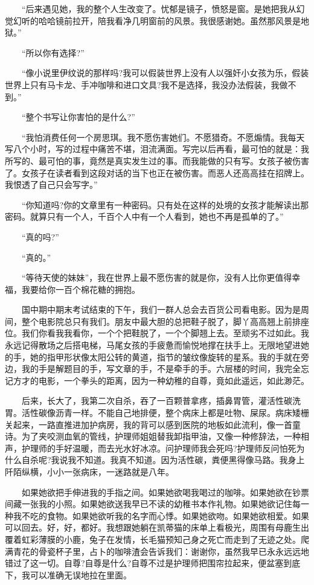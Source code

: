 \documentclass[12pt,UTF8]{ctexbook}
\begin{document}
　　\enquote{后来遇见她，我的整个人生改变了。忧郁是镜子，愤怒是窗。是她把我从幻觉幻听的哈哈镜前拉开，陪我看净几明窗前的风景。我很感谢她。虽然那风景是地狱。}

　　\enquote{所以你有选择?}

　　\enquote{像小说里伊纹说的那样吗?我可以假装世界上没有人以强奸小女孩为乐，假装世界上只有马卡龙、手冲咖啡和进口文具?我不是选择，我没办法假装，我做不到。}

　　\enquote{整个书写让你害怕的是什么?}

　　\enquote{我怕消费任何一个房思琪。我不愿伤害她们。不愿猎奇。不愿煽情。我每天写八个小时，写的过程中痛苦不堪，泪流满面。写完以后再看，最可怕的就是：我所写的、最可怕的事，竟然是真实发生过的事。而我能做的只有写。女孩子被伤害了。女孩子在读者看到这段对话的当下也正在被伤害。而恶人还高高挂在招牌上。我恨透了自己只会写字。}

　　\enquote{你知道吗?你的文章里有一种密码。只有处在这样的处境的女孩才能解读出那密码。就算只有一个人，千百个人中有一个人看到，她也不再是孤单的了。}

　　\enquote{真的吗?}

　　\enquote{真的。}

　　\enquote{等待天使的妹妹}，我在世界上最不愿伤害的就是你，没有人比你更值得幸福，我要给你一百个棉花糖的拥抱。

　　国中期中期末考试结束的下午，我们一群人总会去百货公司看电影。因为是周间，整个电影院总只有我们。朋友中最大胆的总把鞋子脱了，脚丫高高翘上前排座位。我们你看我我看你，一个个把鞋脱了，一个个脚翘上去。至顽劣不过如此。我永远记得散场之后搭电梯，马尾女孩的手疲惫而愉悦地撑在扶手上。无限地望进她的手，她的指甲形状像太阳公转的黄道，指节的皱纹像旋转的星系。我的手就在旁边，我的手是解题目的手，写文章的手，不是牵手的手。六层楼的时间，我完全忘记方才的电影，一个拳头的距离，因为一种幼稚的自尊，竟如此遥远，如此渺茫。

　　后来，长大了，我第二次自杀，吞了一百颗普拿疼，插鼻胃管，灌活性碳洗胃。活性碳像沥青一样。不能自己地排便，整个病床上都是吐物、屎尿。病床矮栅关起来，一路直推进加护病房，我的背可以感到医院的地板如此流利，像一首童诗。为了夹咬测血氧的管线，护理师姐姐替我卸指甲油，又像一种修辞法，一种相声，护理师的手好温暖，而去光水好冰凉。问护理师我会死吗?护理师反问怕死为什么自杀呢?我说我不知道。我真不知道。因为活性碳，粪便黑得像马路。我身上阡陌纵横，小小一张病床，一迷路就是八年。

　　如果她欲把手伸进我的手指之间。如果她欲喝我喝过的咖啡。如果她欲在钞票间藏一张我的小照。如果她欲送我早已不读的幼稚书本作礼物。如果她欲记住每一种我不吃的食物。如果她欲听我的名字而心悸。如果她欲吻。如果她欲相爱。如果可以回去。好，好，都好。我想跟她躺在凯蒂猫的床单上看极光，周围有母鹿生出覆着虹彩薄膜的小鹿，兔子在发情，长毛猫预知己身之死亡而走到了无迹之处。爬满青花的骨瓷杯子里，占卜的咖啡渣会告诉我们：谢谢你，虽然我早已永永远远地错过了这一切。自尊?自尊是什么?自尊不过是护理师把围帘拉起来，便盆塞到底下，我可以准确无误地拉在里面。
\end{document}
